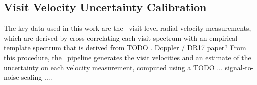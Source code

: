 \documentclass[modern]{aastex63}
\begin{document}



\subsection{Visit Velocity Uncertainty Calibration} \label{sec:visitcalib}

The key data used in this work are the \apogee\ visit-level radial velocity
measurements, which are derived by cross-correlating each visit spectrum with an
empirical template spectrum that is derived from TODO \cite{TODO}. %
Doppler / DR17 paper?
From this procedure, the \apogee\ pipeline generates the visit velocities and an estimate of the uncertainty on each velocity measurement, computed using a TODO ... signal-to-noise scaling ....
\end{document}
